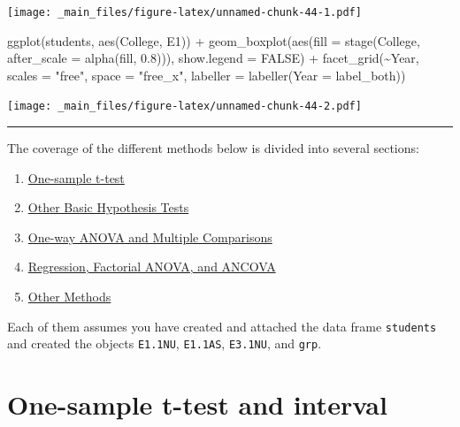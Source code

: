 \documentclass[
]{book}
\newenvironment{Shaded}{\begin{snugshade}}{\end{snugshade}}
\newcommand{\AttributeTok}[1]{\textcolor[rgb]{0.77,0.63,0.00}{#1}}
\newcommand{\ConstantTok}[1]{\textcolor[rgb]{0.00,0.00,0.00}{#1}}
\newcommand{\FloatTok}[1]{\textcolor[rgb]{0.00,0.00,0.81}{#1}}
\newcommand{\FunctionTok}[1]{\textcolor[rgb]{0.00,0.00,0.00}{#1}}
\newcommand{\NormalTok}[1]{#1}
\newcommand{\SpecialCharTok}[1]{\textcolor[rgb]{0.00,0.00,0.00}{#1}}
\newcommand{\StringTok}[1]{\textcolor[rgb]{0.31,0.60,0.02}{#1}}
\providecommand{\tightlist}{%
  \setlength{\itemsep}{0pt}\setlength{\parskip}{0pt}}
\begin{document}
\texttt{[image: \_main\_files/figure-latex/unnamed-chunk-44-1.pdf]}

\begin{Shaded}
\begin{Highlighting}[]
\FunctionTok{ggplot}\NormalTok{(students, }\FunctionTok{aes}\NormalTok{(College, E1)) }\SpecialCharTok{+}
  \FunctionTok{geom\_boxplot}\NormalTok{(}\FunctionTok{aes}\NormalTok{(}\AttributeTok{fill =} \FunctionTok{stage}\NormalTok{(College, }\AttributeTok{after\_scale =} \FunctionTok{alpha}\NormalTok{(fill, }\FloatTok{0.8}\NormalTok{))), }\AttributeTok{show.legend =} \ConstantTok{FALSE}\NormalTok{) }\SpecialCharTok{+}
  \FunctionTok{facet\_grid}\NormalTok{(}\SpecialCharTok{\textasciitilde{}}\NormalTok{Year, }\AttributeTok{scales =} \StringTok{"free"}\NormalTok{, }\AttributeTok{space =} \StringTok{"free\_x"}\NormalTok{, }\AttributeTok{labeller =} \FunctionTok{labeller}\NormalTok{(}\AttributeTok{Year =}\NormalTok{ label\_both))}
\end{Highlighting}
\end{Shaded}

\texttt{[image: \_main\_files/figure-latex/unnamed-chunk-44-2.pdf]}

\begin{center}\rule{0.5\linewidth}{0.5pt}\end{center}

The coverage of the different methods below is divided into several sections:

\begin{enumerate}
\def\labelenumi{\arabic{enumi}.}
\tightlist
\item
  \protect\hyperlink{one-sample-t-test}{One-sample t-test}
\item
  \protect\hyperlink{other-hypothesis-tests}{Other Basic Hypothesis Tests}
\item
  \protect\hyperlink{one-way-anova}{One-way ANOVA and Multiple Comparisons}
\item
  \protect\hyperlink{regression-ancova}{Regression, Factorial ANOVA, and ANCOVA}
\item
  \protect\hyperlink{other-methods}{Other Methods}
\end{enumerate}

Each of them assumes you have created and attached the data frame \texttt{students} and created the objects \texttt{E1.1NU}, \texttt{E1.1AS}, \texttt{E3.1NU}, and \texttt{grp}.

\hypertarget{one-sample-t-test}{%
\section{One-sample t-test and interval}\label{one-sample-t-test}}
\end{document}

